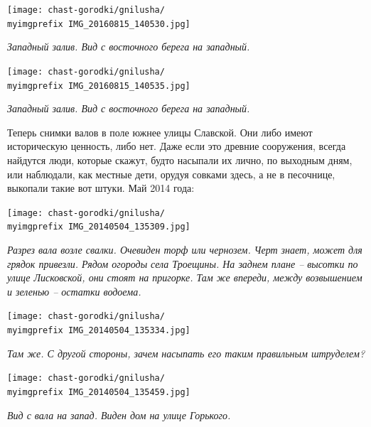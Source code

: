 \begin{center}
\texttt{[image: chast-gorodki/gnilusha/\\myimgprefix IMG\_20160815\_140530.jpg]}

\textit{Западный залив. Вид с восточного берега на западный.}
\end{center}


\begin{center}
\texttt{[image: chast-gorodki/gnilusha/\\myimgprefix IMG\_20160815\_140535.jpg]}

\textit{Западный залив. Вид с восточного берега на западный.}
\end{center}
\newpage

Теперь снимки валов в поле южнее улицы Славской. Они либо имеют историческую ценность, либо нет. Даже если это древние сооружения, всегда найдутся люди, которые скажут, будто насыпали их лично, по выходным дням, или наблюдали, как местные дети, орудуя совками здесь, а не в песочнице, выкопали такие вот штуки. Май 2014 года:

\vspace*{\fill}
\begin{center}
\texttt{[image: chast-gorodki/gnilusha/\\myimgprefix IMG\_20140504\_135309.jpg]}

\textit{Разрез вала возле свалки. Очевиден торф или чернозем. Черт знает, может для грядок привезли. Рядом огороды села Троещины. На заднем плане – высотки по улице Лисковской, они стоят на пригорке. Там же впереди, между возвышением и зеленью – остатки водоема.}
\end{center}
\vspace*{\fill}
\newpage

\begin{center}
\texttt{[image: chast-gorodki/gnilusha/\\myimgprefix IMG\_20140504\_135334.jpg]}

\textit{Там же. С другой стороны, зачем насыпать его таким правильным штруделем?}
\end{center}

%


\begin{center}
\texttt{[image: chast-gorodki/gnilusha/\\myimgprefix IMG\_20140504\_135459.jpg]}

\textit{Вид с вала на запад. Виден дом на улице Горького.}
\end{center}

